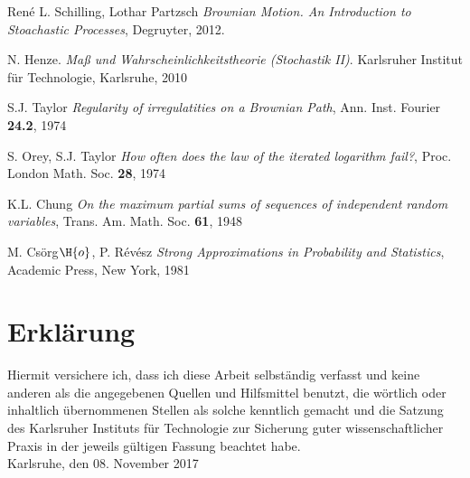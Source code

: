 \documentclass[12pt,a4paper]{scrartcl}
\numberwithin{equation}{section}
\numberwithin{equation}{section}%
\theoremstyle{definition}
\begin{document}
\newpage

\begin{thebibliography}{Lam00}
\thispagestyle{empty}
René L. Schilling, Lothar Partzsch
\emph{Brownian Motion. An Introduction to Stoachastic Processes},
Degruyter, 2012.


N. Henze.
\emph{Maß und Wahrscheinlichkeitstheorie (Stochastik II)}.
Karlsruher Institut für Technologie, Karlsruhe, 2010

S.J. Taylor
\emph{Regularity of irregulatities on a Brownian Path},
Ann. Inst. Fourier \textbf{24.2}, 1974

S. Orey, S.J. Taylor
\emph{How often does the law of the iterated logarithm fail?}, Proc. London Math. Soc. \textbf{28}, 1974

K.L. Chung
\emph{On the maximum partial sums of sequences of independent random variables},
Trans. Am. Math. Soc. \textbf{61}, 1948

M. Csörg$\H{o}$, P. Révész
\emph{Strong Approximations in Probability and Statistics},\linebreak
Academic Press, New York, 1981
\end{thebibliography}

\newpage
  
\thispagestyle{empty}

\vspace*{8cm}


\section*{Erklärung}

Hiermit versichere ich, dass ich diese Arbeit selbständig verfasst und keine anderen als die angegebenen Quellen und Hilfsmittel benutzt, die wörtlich oder inhaltlich übernommenen Stellen als solche kenntlich gemacht und die Satzung des Karlsruher Instituts für Technologie zur Sicherung guter wissenschaftlicher Praxis in der jeweils gültigen Fassung beachtet habe. \\[2ex] 

\noindent
Karlsruhe, den 08. November 2017\\[5ex] 
\end{document}
